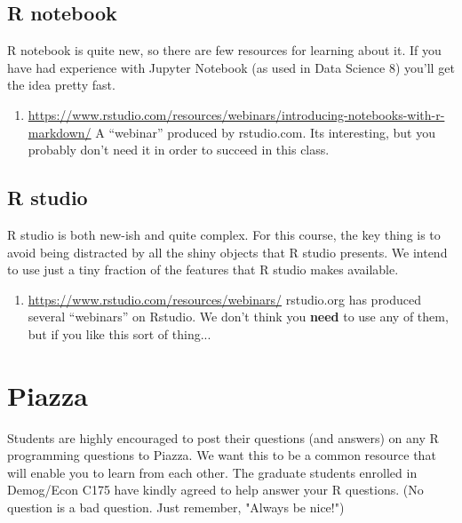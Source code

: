 \documentclass[11pt]{article}
\begin{document}
\subsection{R notebook}
\label{sec:Rnote}

R notebook is quite new, so there are few resources for learning about it. If you have had experience with Jupyter Notebook (as used in Data Science 8) you'll get the idea pretty fast. 
\begin{enumerate}
\item \url{https://www.rstudio.com/resources/webinars/introducing-notebooks-with-r-markdown/} A ``webinar'' produced by rstudio.com.  Its interesting, but you probably don't need it in order to succeed in this class.
\end{enumerate}

\subsection{R studio}
\label{sec:Rstud}

R studio is both new-ish and quite complex. For this course, the key thing is to avoid being distracted by all the shiny objects that R studio presents.  We intend to use just a tiny fraction of the features that R studio makes available.
\begin{enumerate}
\item \url{https://www.rstudio.com/resources/webinars/} rstudio.org has produced several ``webinars'' on Rstudio.  We don't think you \textbf{need} to  use any of them, but if you like this sort of thing...
\end{enumerate}

\section{Piazza}
\label{sec:piazza}

Students are highly encouraged to post their questions (and answers)
on any R programming questions to Piazza. We want this to be a common
resource that will enable you to learn from each other. The graduate
students enrolled in Demog/Econ C175 have kindly agreed to help answer your R
questions. (No question is a bad question. Just remember, "Always be
nice!")
\end{document}
